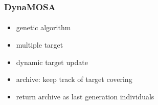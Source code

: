 \begin{frame}
	\frametitle{DynaMOSA}
	\framesubtitle{\cite{Panichella.2017}}
	
	\begin{itemize}
		\item genetic algorithm
		\item multiple target
		\item dynamic target update
		\item archive: keep track of target covering
		\item return archive as last generation individuals
		\end{itemize}
	
\end{frame}